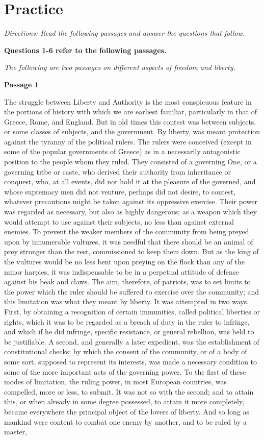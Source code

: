\section{Practice}

\textit{Directions: Read the following passages and answer the questions that follow.}

\bigskip
\textbf{Questions 1-6 refer to the following passages.}

\bigskip
\textit{The following are two passages on different aspects of freedom and liberty.}

\bigskip
\textbf{Passage 1}
\begin{linenumbers*}
\modulolinenumbers[5]
\indent The struggle between Liberty and Authority is the most conspicuous feature in the portions of history with which we are earliest familiar, particularly in that of Greece, Rome, and England. But in old times this contest was between subjects, or some classes of subjects, and the government. By liberty, was meant protection against the tyranny of the political rulers. The rulers were conceived (except in some of the popular governments of Greece) as in a necessarily antagonistic position to the people whom they ruled. They consisted of a governing One, or a governing tribe or caste, who derived their authority from inheritance or conquest, who, at all events, did not hold it at the pleasure of the governed, and whose supremacy men did not venture, perhaps did not desire, to contest, whatever precautions might be taken against its oppressive exercise. Their power was regarded as necessary, but also as highly dangerous; as a weapon which they would attempt to use against their subjects, no less than against external enemies. To prevent the weaker members of the community from being preyed upon by innumerable vultures, it was needful that there should be an animal of prey stronger than the rest, commissioned to keep them down. But as the king of the vultures would be no less bent upon preying on the flock than any of the minor harpies, it was indispensable to be in a perpetual attitude of defense against his beak and claws. The aim, therefore, of patriots, was to set limits to the power which the ruler should be suffered to exercise over the community; and this limitation was what they meant by liberty. It was attempted in two ways. First, by obtaining a recognition of certain immunities, called political liberties or rights, which it was to be regarded as a breach of duty in the ruler to infringe, and which if he did infringe, specific resistance, or general rebellion, was held to be justifiable. A second, and generally a later expedient, was the establishment of constitutional checks; by which the consent of the community, or of a body of some sort, supposed to represent its interests, was made a necessary condition to some of the more important acts of the governing power. To the first of these modes of limitation, the ruling power, in most European countries, was compelled, more or less, to submit. It was not so with the second; and to attain this, or when already in some degree possessed, to attain it more completely, became everywhere the principal object of the lovers of liberty. And so long as mankind were content to combat one enemy by another, and to be ruled by a master, 
\end{linenumbers*}
